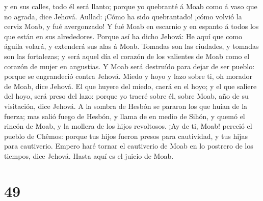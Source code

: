 y en sus calles, todo él será llanto; porque yo quebranté á Moab como á
vaso que no agrada, dice Jehová.  Aullad: ¡Cómo ha sido
quebrantado! ¡cómo volvió la cerviz Moab, y fué avergonzado! Y fué Moab
en escarnio y en espanto á todos los que están en sus alrededores.
 Porque así ha dicho Jehová: He aquí que como águila
volará, y extenderá sus alas á Moab.  Tomadas son las
ciudades, y tomadas son las fortalezas; y será aquel día el corazón de
los valientes de Moab como el corazón de mujer en angustias.
 Y Moab será destruído para dejar de ser pueblo: porque se
engrandeció contra Jehová.  Miedo y hoyo y lazo sobre ti,
oh morador de Moab, dice Jehová.  El que huyere del miedo,
caerá en el hoyo; y el que saliere del hoyo, será preso del lazo: porque
yo traeré sobre él, sobre Moab, año de su visitación, dice Jehová.
 A la sombra de Hesbón se pararon los que huían de la
fuerza; mas salió fuego de Hesbón, y llama de en medio de Sihón, y quemó
el rincón de Moab, y la mollera de los hijos revoltosos. 
¡Ay de ti, Moab! pereció el pueblo de Chêmos: porque tus hijos fueron
presos para cautividad, y tus hijas para cautiverio. 
Empero haré tornar el cautiverio de Moab en lo postrero de los tiempos,
dice Jehová. Hasta aquí es el juicio de Moab.

\hypertarget{section-48}{%
\section{49}\label{section-48}}

